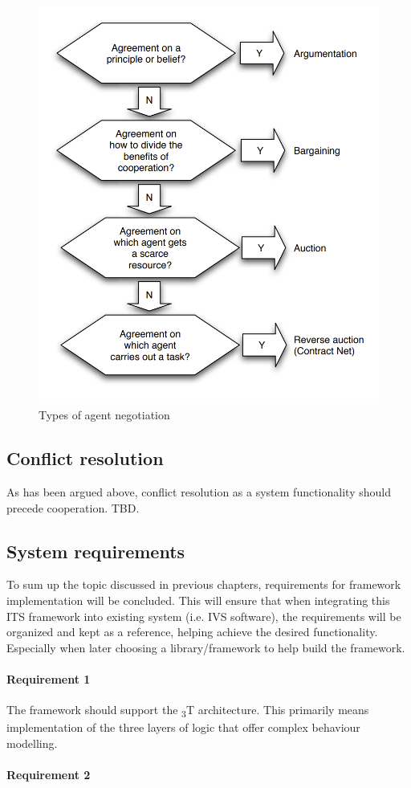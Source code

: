 \documentclass[main.tex]{subfiles}
\begin{document}
\begin{figure}[htbp]
    \centering
    \includegraphics[width=.8\textwidth]{speech-acts.png}
    \caption{Types of agent negotiation \cite{Binder2022}}
    \label{fig-speech-acts}
\end{figure}

\subsection{Conflict resolution}

As has been argued above, conflict resolution as a system functionality should precede cooperation. 
TBD. 

\subsection{System requirements}

To sum up the topic discussed in previous chapters, requirements for framework implementation will be 
concluded. This will ensure that when integrating this ITS framework into existing system (i.e. IVS 
software), the requirements will be organized and kept as a reference, helping achieve the desired 
functionality. Especially when later choosing a library/framework to help build the framework. 

\paragraph{Requirement 1} The framework should support the \textsubscript{3}T architecture. 
This primarily means implementation of the three layers of logic that offer complex behaviour 
modelling.

\paragraph{Requirement 2} 
\end{document}
